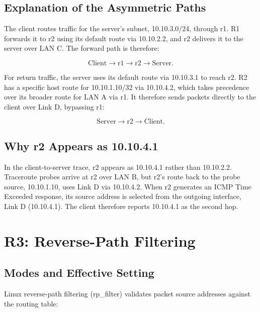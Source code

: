 \documentclass[12pt]{article}
\begin{document}
\subsection{Explanation of the Asymmetric Paths}

The client routes traffic for the server's subnet, 10.10.3.0/24, through r1. R1 forwards it to r2 using its default route via 10.10.2.2, and r2 delivers it to the server over LAN C. The forward path is therefore:

\[
\text{Client} \rightarrow \text{r1} \rightarrow \text{r2}
\rightarrow \text{Server}.
\]

For return traffic, the server uses its default route via 10.10.3.1 to reach r2. R2 has a specific host route for 10.10.1.10/32 via 10.10.4.2, which takes precedence over its broader route for LAN A via r1. It therefore sends packets directly to the client over Link D, bypassing r1:

\[
\text{Server} \rightarrow \text{r2} \rightarrow \text{Client}.
\]

\subsection{Why r2 Appears as 10.10.4.1}

In the client-to-server trace, r2 appears as 10.10.4.1 rather than 10.10.2.2. Traceroute probes arrive at r2 over LAN B, but r2's route back to the probe source, 10.10.1.10, uses Link D via 10.10.4.2. When r2 generates an ICMP Time Exceeded response, its source address is selected from the outgoing interface, Link D (10.10.4.1). The client therefore reports 10.10.4.1 as the second hop.

\newpage


\section{R3: Reverse-Path Filtering}
\label{sec:r3}

\subsection{Modes and Effective Setting}

Linux reverse-path filtering ({rp\_filter}) validates packet source addresses against the routing table:
\end{document}
